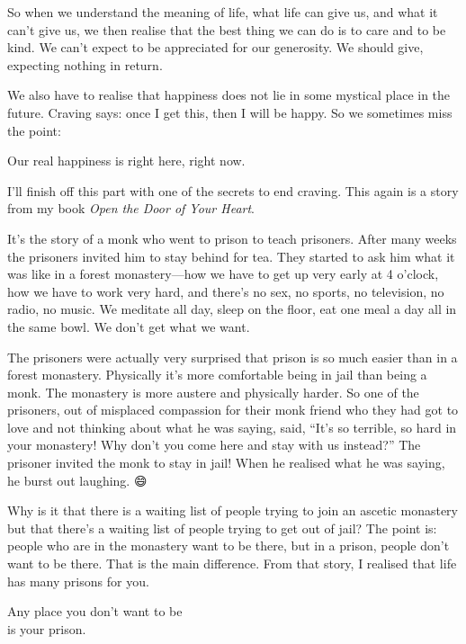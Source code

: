\documentclass[12pt, openany]{book}
\newenvironment{aphorism}%
{%
\begin{center}\begin{itshape}
}%
{\end{itshape}\end{center}
}%
\begin{document}
So when we understand the meaning of life, what life can give us, and what it can’t give us, we then realise that the best thing we can do is to care and to be kind. We can’t expect to be appreciated for our generosity. We should give, expecting nothing in return. 

We also have to realise that happiness does not lie in some mystical place in the future. Craving says: once I get this, then I will be happy. So we sometimes miss the point: 

\begin{aphorism}
Our real happiness is right here, right now.
\end{aphorism}

I’ll finish off this part with one of the secrets to end craving. This again is a story from my book \emph{Open the Door of Your Heart}. 

It’s the story of a monk who went to prison to teach prisoners. After many weeks the prisoners invited him to stay behind for tea. They started to ask him what it was like in a forest monastery—how we have to get up very early at 4 o’clock, how we have to work very hard, and there’s no sex, no sports, no television, no radio, no music. We meditate all day, sleep on the floor, eat one meal a day all in the same bowl. We don’t get what we want. 

The prisoners were actually very surprised that prison is so much easier than in a forest monastery. Physically it’s more comfortable being in jail than being a monk. The monastery is more austere and physically harder. So one of the prisoners, out of misplaced compassion for their monk friend who they had got to love and not thinking about what he was saying, said, “It’s so terrible, so hard in your monastery! Why don’t you come here and stay with us instead?” The prisoner invited the monk to stay in jail! When he realised what he was saying, he burst out laughing. 😄

Why is it that there is a waiting list of people trying to join an ascetic monastery but that there’s a waiting list of people trying to get out of jail? The point is: people who are in the monastery want to be there, but in a prison, people don’t want to be there. That is the main difference. From that story, I realised that life has many prisons for you. 

\begin{aphorism}
Any place you don’t want to be\\  
is your prison.
\end{aphorism}
\end{document}
